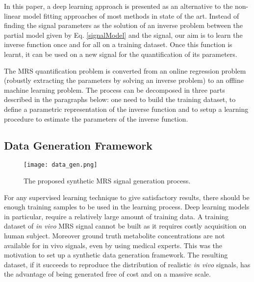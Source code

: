 \documentclass{llncs}
\begin{document}
In this paper, a deep learning approach is presented as an alternative to the non-linear model fitting approaches of most methods in state of the art.
Instead of finding the signal parameters as the solution of an inverse problem between the partial model given by Eq. \ref{signalModel} and the signal,
our aim is to learn the inverse function once and for all on a training dataset.
Once this function is learnt, it can be used on a new signal for the quantification of its parameters.

The MRS quantification problem is converted from an online regression problem (robustly extracting the parameters by solving an inverse problem) to an
offline machine learning problem.
The process can be decomposed in three parts described in the paragraphs below:
one need to build the training dataset, to define a parametric representation of the inverse function 
and to setup a learning procedure to estimate the parameters of the inverse function.



\subsection{Data Generation Framework}

\begin{figure*}[t!]
\centering
\texttt{[image: data\_gen.png]}
\caption{The proposed synthetic MRS signal generation process.}
\label{figDataGeneration}
\end{figure*}

For any supervised learning technique to give satisfactory results, 
there should be enough training samples to be used in the learning process. 
Deep learning models in particular, require a relatively large amount of training data. 
A training dataset of \textit{in vivo} MRS signal cannot be built as it requires costly acquisition on human subject. Moreover ground truth metabolite concentrations are not available for in vivo signals, even by using medical experts.
This was the motivation to set up a synthetic data generation framework. 
The resulting dataset, if it succeeds to reproduce the distribution of realistic \textit{in vivo }signals,
has the advantage of being generated free of cost and on a massive scale.
\end{document}
